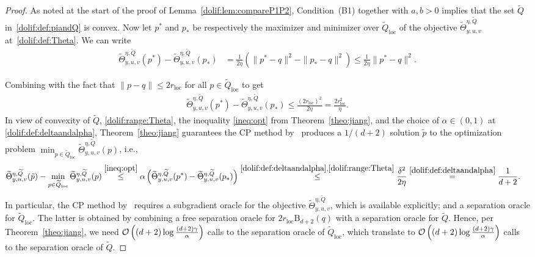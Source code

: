 \documentclass[11pt,letterpaper]{article}
\newcommand{\ball}{\mathrm{B}}
\newcommand{\local}{\mathrm{loc}}
\newcommand{\Q}{\widetilde{Q}}
\begin{document}
\begin{proof}  
As noted at the start of the proof of Lemma~\ref{dolif:lem:compareP1P2}, Condition~(B1) together with $a,b>0$ implies that the set $\Q$ in~\eqref{dolif:def:piandQ} is convex. Now let $p^*$ and $p_*$ be respectively the maximizer and minimizer over $\Q_\local$ of  the objective $\widetilde{\Theta}^{\eta,\Q}_{y,u,v}$ at~\eqref{dolif:def:Theta}. We can write
\begin{align*}
    \widetilde{\Theta}^{\eta,\Q}_{y,u,v}( p^*)-\widetilde{\Theta}^{\eta,\Q}_{y,u,v}( p_*)
    &=
    \frac{1}{2\eta}\left(\| p^*- q\|^2-\| p_*- q\|^2\right)
    \le \frac{1}{2\eta}\| p^*- q\|^2.
\end{align*}



Combining with the fact that 
$\| p- q\|\le 2r_{\local}$ for all $ p\in \Q_{\local}$ to get
\begin{align}
\label{dolif:range:Theta}
    \widetilde{\Theta}^{\eta,\Q}_{y,u,v}( p^*)-\widetilde{\Theta}^{\eta,\Q}_{y,u,v}( p_*)
    \le \frac{(2r_{\local})^2}{2\eta}
    =\frac{2r_{\local}^2}{\eta}.
\end{align}
In view of convexity of $\Q$, \eqref{dolif:range:Theta}, the inequality \eqref{ineq:opt} from
Theorem~\ref{theo:jiang}, and the choice of $\alpha\in(0,1)$ at
\eqref{dolif:def:deltaandalpha}, Theorem~\ref{theo:jiang} guarantees the CP method by~\cite{jiang2020cuttingplane} produces a $1/(d+2)$ solution $\tilde{p}$ to the optimization problem
$\min_{ p\in \Q_{\local}} \widetilde{\Theta}^{\eta,\Q}_{y,u,v}( p)$, i.e.,
\begin{align*}
    \widetilde{\Theta}^{\eta,\Q}_{y,u,v}(\tilde p)-\min_{ p\in \Q_{\local}}\widetilde{\Theta}^{\eta,\Q}_{y,u,v}( p)
    &\stackrel{\eqref{ineq:opt}}{\le}
    \alpha\left(\widetilde{\Theta}^{\eta,\Q}_{y,u,v}( p^*)-\widetilde{\Theta}^{\eta,\Q}_{y,u,v}( p_*)\right)
    \stackrel{\eqref{dolif:def:deltaandalpha},\eqref{dolif:range:Theta}}{\le}
    \frac{\delta^2}{2\eta}\stackrel{\eqref{dolif:def:deltaandalpha}}{=}\frac{1}{d+2}. 
\end{align*}
In particular, the CP method by~\cite{jiang2020cuttingplane} requires a subgradient oracle for the objective $\widetilde{\Theta}^{\eta,\Q}_{y,u,v}$, which is available explicitly; and a separation oracle for $\Q_{\local}$. The latter is obtained by combining a free separation oracle for $2r_{\local}\ball_{d+2}(q)$ with a separation oracle for $\Q$. Hence, per Theorem~\ref{theo:jiang}, we need ${\cal O} \left((d+2) \log \frac{(d+2) \gamma}{\alpha}\right)$ calls to the separation
oracle of $\Q_{\local}$, which translate to ${\cal O} \left((d+2) \log \frac{(d+2) \gamma}{\alpha}\right)$ calls to the separation
oracle of $\Q$. 


\end{proof}
\end{document}
